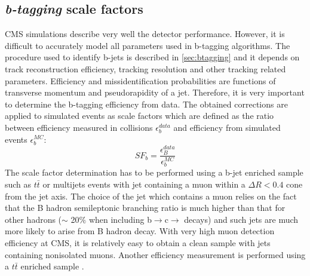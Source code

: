 
\subsection{\textit{b-tagging} scale factors}
\label{sec:btag}

CMS simulations describe very well the detector performance. However, it is difficult to accurately model all parameters used in b-tagging algorithms. The procedure used to identify b-jets is described in \ref{sec:btagging} and it depends on track reconstruction efficiency, tracking resolution and other tracking related parameters. Efficiency and missidentification probabilities are functions of transverse momentum and pseudorapidity of a jet. Therefore, it is very important to determine the b-tagging efficiency from data. The obtained corrections are applied to simulated events as scale factors which are defined as the ratio between efficiency measured in collisions $\epsilon_b^{data}$ and efficiency from simulated events $\epsilon_b^{MC}$:
\begin{equation}
SF_b=\frac{\epsilon_B^{data}}{\epsilon_b^{MC}}
\end{equation}
The scale factor determination has to be performed using a b-jet enriched sample such as $t\bar{t}$ or multijets events with jet containing a muon within a $\Delta R <0.4$ cone from the jet axis. The choice of the jet which contains a muon relies on the fact that the B hadron semileptonic branching ratio is much higher than that for other hadrons ($\sim$ 20$\%$ when including b$\rightarrow$c$\rightarrow$ decays) and such jets are much more likely to arise from B hadron decay. With very high muon detection efficiency at CMS, it is relatively easy to obtain a clean sample with jets containing nonisolated muons. Another efficiency measurement is performed using a $t\bar{t}$ enriched sample \cite{CMS:2013vea}.
